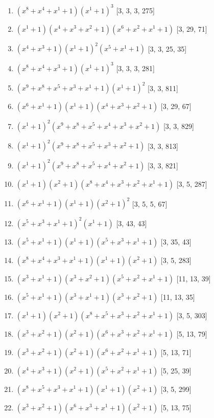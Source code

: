 \documentclass[10pt,twocolumn]{article}
\begin{document}
\begin{enumerate}
\item $(x^{8} + x^{4} + x^{1} + 1)(x^{1} + 1)^{3}$  [3, 3, 3, 275]
\item $(x^{1} + 1)(x^{4} + x^{3} + x^{2} + 1)(x^{6} + x^{2} + x^{1} + 1)$  [3, 29, 71]
\item $(x^{4} + x^{3} + 1)(x^{1} + 1)^{2}(x^{5} + x^{1} + 1)$  [3, 3, 25, 35]
\item $(x^{8} + x^{4} + x^{3} + 1)(x^{1} + 1)^{3}$  [3, 3, 3, 281]
\item $(x^{9} + x^{8} + x^{5} + x^{3} + x^{1} + 1)(x^{1} + 1)^{2}$  [3, 3, 811]
\item $(x^{6} + x^{1} + 1)(x^{1} + 1)(x^{4} + x^{3} + x^{2} + 1)$  [3, 29, 67]
\item $(x^{1} + 1)^{2}(x^{9} + x^{8} + x^{5} + x^{4} + x^{3} + x^{2} + 1)$  [3, 3, 829]
\item $(x^{1} + 1)^{2}(x^{9} + x^{8} + x^{5} + x^{3} + x^{2} + 1)$  [3, 3, 813]
\item $(x^{1} + 1)^{2}(x^{9} + x^{8} + x^{5} + x^{4} + x^{2} + 1)$  [3, 3, 821]
\item $(x^{1} + 1)(x^{2} + 1)(x^{8} + x^{4} + x^{3} + x^{2} + x^{1} + 1)$  [3, 5, 287]
\item $(x^{6} + x^{1} + 1)(x^{1} + 1)(x^{2} + 1)^{2}$  [3, 5, 5, 67]
\item $(x^{5} + x^{3} + x^{1} + 1)^{2}(x^{1} + 1)$  [3, 43, 43]
\item $(x^{5} + x^{1} + 1)(x^{1} + 1)(x^{5} + x^{3} + x^{1} + 1)$  [3, 35, 43]
\item $(x^{8} + x^{4} + x^{3} + x^{1} + 1)(x^{1} + 1)(x^{2} + 1)$  [3, 5, 283]
\item $(x^{3} + x^{1} + 1)(x^{3} + x^{2} + 1)(x^{5} + x^{2} + x^{1} + 1)$  [11, 13, 39]
\item $(x^{5} + x^{1} + 1)(x^{3} + x^{1} + 1)(x^{3} + x^{2} + 1)$  [11, 13, 35]
\item $(x^{1} + 1)(x^{2} + 1)(x^{8} + x^{5} + x^{3} + x^{2} + x^{1} + 1)$  [3, 5, 303]
\item $(x^{3} + x^{2} + 1)(x^{2} + 1)(x^{6} + x^{3} + x^{2} + x^{1} + 1)$  [5, 13, 79]
\item $(x^{3} + x^{2} + 1)(x^{2} + 1)(x^{6} + x^{2} + x^{1} + 1)$  [5, 13, 71]
\item $(x^{4} + x^{3} + 1)(x^{2} + 1)(x^{5} + x^{2} + x^{1} + 1)$  [5, 25, 39]
\item $(x^{8} + x^{5} + x^{3} + x^{1} + 1)(x^{1} + 1)(x^{2} + 1)$  [3, 5, 299]
\item $(x^{3} + x^{2} + 1)(x^{6} + x^{3} + x^{1} + 1)(x^{2} + 1)$  [5, 13, 75]

\end{enumerate}
\end{document}
